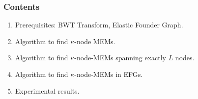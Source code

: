 \begin{frame}
	\frametitle{Contents}
	\begin{enumerate}
		\item Prerequisites: BWT Transform, Elastic Founder Graph.
		\item Algorithm to find \(\kappa\)-node MEMs.
		\item Algorithm to find \(\kappa\)-node-MEMs spanning exactly \(L\) nodes.
		\item Algorithm to find \(\kappa\)-node-MEMs in EFGs.
		\item Experimental results.
	\end{enumerate}

\end{frame}